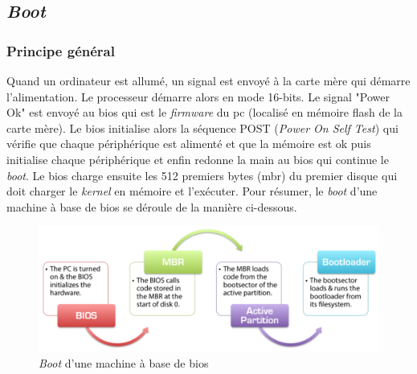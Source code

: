 \documentclass[a4paper]{article}
\begin{document}

\subsection{\textit{Boot}}
\subsubsection{Principe général}
Quand un ordinateur est allumé, un signal est envoyé à la carte mère qui démarre
l'alimentation. Le processeur démarre alors en mode 16-bits. Le signal "Power Ok"
est envoyé au \acrshort{bios} qui est le \textit{firmware} du \acrshort{pc}
(localisé en mémoire flash de la carte mère). Le \acrshort{bios} initialise alors
la séquence POST (\textit{Power On Self Test}) qui vérifie que chaque périphérique
est alimenté et que la mémoire est ok puis initialise chaque périphérique et enfin
redonne la main au \acrshort{bios} qui continue le \textit{boot}. Le \acrshort{bios}
charge ensuite les 512 premiers bytes (\acrshort{mbr}) du premier disque qui doit
charger le \textit{kernel} en mémoire et l'exécuter. Pour résumer, le \textit{boot}
d'une machine à base de \acrshort{bios} se déroule de la manière ci-dessous.

\begin{figure}[!h]
  \centering
  \includegraphics[scale=0.4]{images/bios_boot.png}
  \caption{\textit{Boot} d'une machine à base de \acrshort{bios}}
\end{figure}
\end{document}
